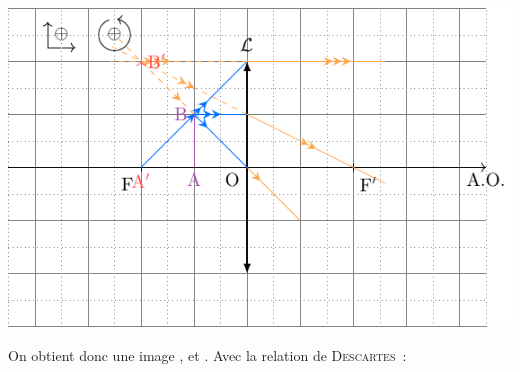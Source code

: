 \documentclass[a4paper, 10pt, garamond, oneside]{book}
\begin{document}
{\begin{enumerate}
\begin{minipage}[t]{.48\linewidth}
\begin{center}
				      \includegraphics[width=\linewidth]{convCF}
			      \end{center}
		      \end{minipage}
		      \noindent
		      \begin{minipage}[t]{.48\linewidth}

			      On obtient donc une image ,  et
			      . Avec la relation de \textsc{Descartes}~:


\end{minipage}
\end{enumerate}}
\end{document}
